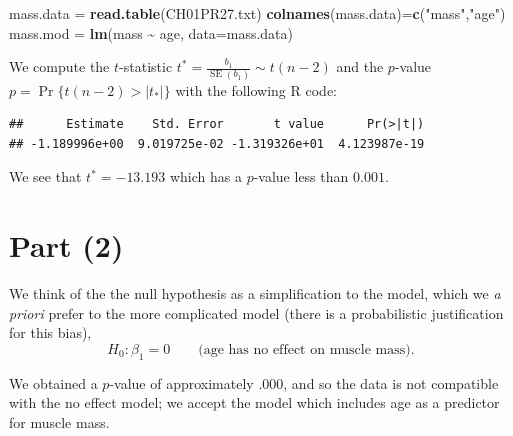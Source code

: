 \documentclass[
]{article}
\newenvironment{Shaded}{\begin{snugshade}}{\end{snugshade}}
\newcommand{\AttributeTok}[1]{\textcolor[rgb]{0.13,0.29,0.53}{#1}}
\newcommand{\DecValTok}[1]{\textcolor[rgb]{0.00,0.00,0.81}{#1}}
\newcommand{\FunctionTok}[1]{\textcolor[rgb]{0.13,0.29,0.53}{\textbf{#1}}}
\newcommand{\NormalTok}[1]{#1}
\newcommand{\OtherTok}[1]{\textcolor[rgb]{0.56,0.35,0.01}{#1}}
\newcommand{\SpecialCharTok}[1]{\textcolor[rgb]{0.81,0.36,0.00}{\textbf{#1}}}
\newcommand{\StringTok}[1]{\textcolor[rgb]{0.31,0.60,0.02}{#1}}
\begin{document}
\begin{Shaded}
\begin{Highlighting}[]
\NormalTok{mass.data }\OtherTok{=} \FunctionTok{read.table}\NormalTok{(}\StringTok{\textquotesingle{}CH01PR27.txt\textquotesingle{}}\NormalTok{)}
\FunctionTok{colnames}\NormalTok{(mass.data)}\OtherTok{=}\FunctionTok{c}\NormalTok{(}\StringTok{"mass"}\NormalTok{,}\StringTok{"age"}\NormalTok{)}
\NormalTok{mass.mod }\OtherTok{=} \FunctionTok{lm}\NormalTok{(mass }\SpecialCharTok{\textasciitilde{}}\NormalTok{ age, }\AttributeTok{data=}\NormalTok{mass.data)}
\end{Highlighting}
\end{Shaded}

We compute the \(t\)-statistic
\(t^* = \frac{b_1}{\operatorname{SE}(b_1)} \sim t(n-2)\) and the
\(p\)-value \(p = \Pr\{t(n-2) > |t_*|\}\) with the following R code:

\begin{Shaded}
\end{Shaded}

\begin{verbatim}
##      Estimate    Std. Error       t value      Pr(>|t|) 
## -1.189996e+00  9.019725e-02 -1.319326e+01  4.123987e-19
\end{verbatim}

We see that \(t^* = -13.193\) which has a \(p\)-value less than
\(0.001\).

\hypertarget{part-2}{%
\section{Part (2)}\label{part-2}}


We think of the the null hypothesis as a simplification to the model,
which we \emph{a priori} prefer to the more complicated model (there is
a probabilistic justification for this bias), \[
  H_0 \colon \beta_1 = 0 \qquad \text{(age has no effect on muscle mass)}.
\]

We obtained a \(p\)-value of approximately \(.000\), and so the data is
not compatible with the no effect model; we accept the model which
includes age as a predictor for muscle mass.
\end{document}
